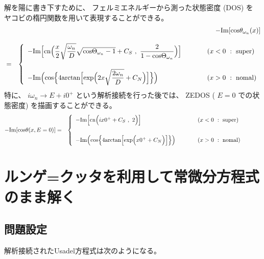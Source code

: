 \documentclass[uplatex,a4j,12pt,dvipdfmx]{jsarticle}
\begin{document}
解を陽に書き下すために、
フェルミエネルギーから測った状態密度 (DOS) を
ヤコビの楕円関数を用いて表現することができる。
\begin{eqnarray}
	&&
	- {\rm Im}[{\rm cos}\theta_{\omega_{n}}(x)]
	\nonumber \\[3mm]
	&=&
	\left\{
	\begin{array}{ll}
		-{\rm Im} \Big[
			{\rm cn}
			\Big(
			\dfrac{x}{2}
			\sqrt{ \dfrac{ \omega_{n} }{ D } }
			\sqrt{ {\rm cos} \Theta_{\omega_{n}} - 1 }
			+
			C_{S}
			\ , \
			\dfrac{2}{ 1 - {\rm cos} \Theta_{\omega_{n}} }
			\Big)
			\Big]
		 &
		\hspace{10mm}
		(x<0 \ : \ {\rm super})
		\\[7mm]
		-{\rm Im} \Big(
		{\rm cos}
		\Big\{
		4
		{\rm arctan}
		\Big[
			{\rm exp}
			\Big(
			2x
			\sqrt{ \dfrac{2 \omega_{n} }{ D } }
			+
			C_{N}
			\Big)
			\Big]
		\Big\}
		\Big)
		 &
		\hspace{10mm}
		(x>0 \ : \ {\rm nomal})
	\end{array}
	\right.
\end{eqnarray}
特に、 $i \omega_{n} \to E + i 0^{+}$ という解析接続を行った後では、
ZEDOS ( $E=0$ での状態密度) を描画することができる。
\begin{eqnarray}
	- {\rm Im}[{\rm cos}\theta(x,E=0)]
	&=&
	\left\{
	\begin{array}{ll}
		-{\rm Im} \Big[
			{\rm cn}
			\Big(
			i x 0^{+}
			+
			C_{S}
			\ , \
			2
			\Big)
			\Big]
		 &
		\hspace{10mm}
		(x<0 \ : \ {\rm super})
		\\[7mm]
		-{\rm Im} \Big(
		{\rm cos}
		\Big\{
		4
		{\rm arctan}
		\Big[
			{\rm exp}
			\Big(
			x
			0^{+}
			+
			C_{N}
			\Big)
			\Big]
		\Big\}
		\Big)
		 &
		\hspace{10mm}
		(x>0 \ : \ {\rm nomal} )
	\end{array}
	\right.
	\hspace{10mm}
\end{eqnarray}

\section{ルンゲ=クッタを利用して常微分方程式のまま解く}

\subsection{問題設定}

解析接続されたUsadel方程式は次のようになる。
\end{document}
